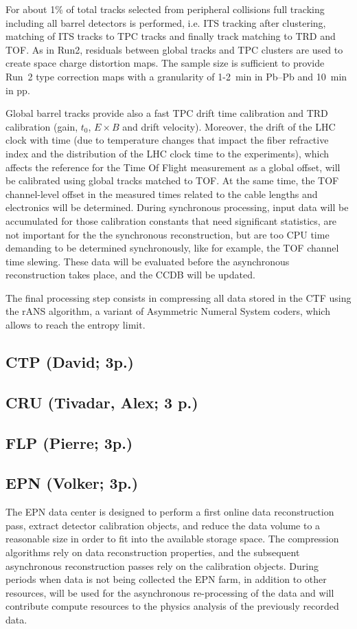 For about 1\% of total tracks selected from peripheral collisions
full tracking including all
barrel detectors is performed, i.e. ITS tracking after clustering,
matching of ITS tracks to TPC tracks
and finally track matching to TRD and TOF. As in Run2, residuals
between
global tracks and TPC clusters are used to create space charge
distortion maps. The sample size is sufficient to provide
Run~2 type correction maps with a granularity of  1-2~min in Pb--Pb and 10~min
in pp.


Global barrel tracks provide also a fast TPC drift
time calibration and TRD calibration (gain, $t_0$, $E \times B$ and drift
velocity). Moreover, the drift of the LHC clock with time (due to temperature
changes that impact the fiber refractive index and the distribution of the LHC clock time to the experiments), which affects the
reference for the Time Of Flight measurement as a global offset,
will be calibrated using global tracks matched to TOF. At the same
time, the TOF channel-level offset in the measured times related to
the cable lengths and electronics will be determined.
During  synchronous processing, input data will be accumulated
for those calibration constants that need significant statistics, are not
important for the the synchronous reconstruction, but are too CPU time demanding to be determined synchronously, like for example, the TOF channel time
slewing. These data will be evaluated before the asynchronous
reconstruction takes place, and the CCDB will be updated.


The final processing step consists in compressing all data stored in the CTF using the rANS algorithm, a variant of
Asymmetric Numeral System coders, which allows to reach the entropy limit.
\subsection{CTP (David; 3p.)}
\subsection{CRU (Tivadar, Alex; 3 p.)}
\subsection{FLP (Pierre; 3p.)}

\subsection{EPN (Volker; 3p.)}

The EPN data center is designed to perform a first online data reconstruction pass, extract detector calibration objects, and reduce the data volume to a reasonable size in order to fit into the available storage space. 
The compression algorithms rely on data reconstruction properties, and the subsequent asynchronous reconstruction passes rely on the calibration objects.
During periods when data is not being collected the EPN farm, in addition to other resources, will be used for the asynchronous re-processing of the data and will contribute compute resources to the physics analysis of the previously recorded data.

